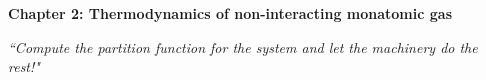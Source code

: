 \renewcommand{\theequation}{2.\arabic{equation}}

\begin{frame}
\begin{center}
{\bf Chapter 2: Thermodynamics of non-interacting monatomic gas}\\
\end{center}

\setcounter{equation}{0}

\scriptsize

\vspace*{3cm}

\begin{center}
\textit{``Compute the partition function for the system and let the machinery do the rest!"}
\end{center}

\end{frame}

\scriptsize









%
%
%
